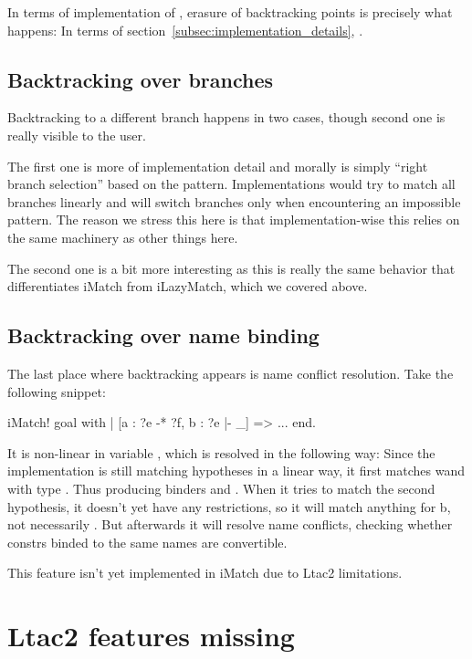 In terms of implementation of , erasure of backtracking points is precisely what happens:
In terms of section~\ref{subsec:implementation_details}, .

\subsection{Backtracking over branches}

Backtracking to a different branch happens in two cases, though second one is really visible to the user.

The first one is more of implementation detail and morally is simply ``right branch selection'' based on the pattern.
Implementations would try to match all branches linearly and will switch branches only when encountering an impossible pattern.
The reason we stress this here is that implementation-wise this relies on the same  machinery as other things here.

The second one is a bit more interesting as this is really the same behavior that differentiates iMatch from iLazyMatch, which we covered above.

\subsection{Backtracking over name binding}

The last place where backtracking appears is name conflict resolution.
Take the following snippet:

\begin{coq}
iMatch! goal with
| [a : ?e -* ?f, b : ?e |- _] => ...
end.
\end{coq}

It is non-linear in variable , which is resolved in the following way:
Since the implementation is still matching hypotheses in a linear way, it first matches wand  with type .
Thus producing binders  and .
When it tries to match the second hypothesis, it doesn't yet have any restrictions, so it will match anything for b, not necessarily .
But afterwards it will resolve name conflicts, checking whether constrs binded to the same names are convertible.

This feature isn't yet implemented in iMatch due to Ltac2 limitations.

\section{Ltac2 features missing}

